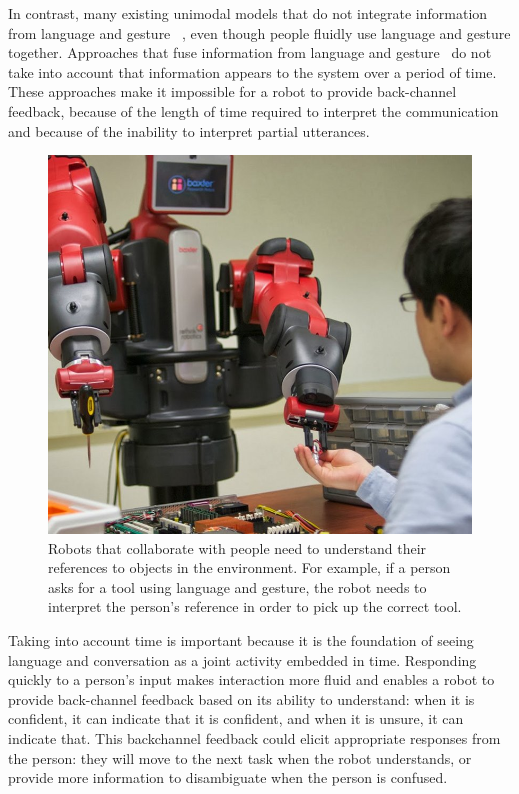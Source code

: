 \documentclass[letterpaper, 10 pt, conference]{ieeeconf}
\begin{document}
In contrast, many existing unimodal models that do not integrate
information from language and gesture~\citep{matuszek14, tellex11,
  kollar10} , even though people fluidly use language and gesture
together.  Approaches that fuse information from language and
gesture~\citep{matuszek14} do not take into account that information
appears to the system over a period of time.  These approaches make it
impossible for a robot to provide back-channel feedback, because of
the length of time required to interpret the communication and because
of the inability to interpret partial utterances.

\begin{figure}
\centering
\includegraphics[width=1\linewidth]{figures/baxter_scene_cropped.jpg}
\caption{Robots that collaborate with people need to understand their
  references to objects in the environment.  For example, if a person
  asks for a tool using language and gesture, the robot needs to
  interpret the person's reference in order to pick up the correct
  tool.\label{fig:example}}
\end{figure}


Taking into account time is important because it is the foundation of
seeing language and conversation as a joint activity embedded in time.
Responding quickly to a person's input makes interaction more fluid
and enables a robot to provide back-channel feedback based on its
ability to understand: when it is confident, it can indicate that it
is confident, and when it is unsure, it can indicate that.  This
backchannel feedback could elicit appropriate responses from the
person: they will move to the next task when the robot understands, or
provide more information to disambiguate when the person is confused.
\end{document}

